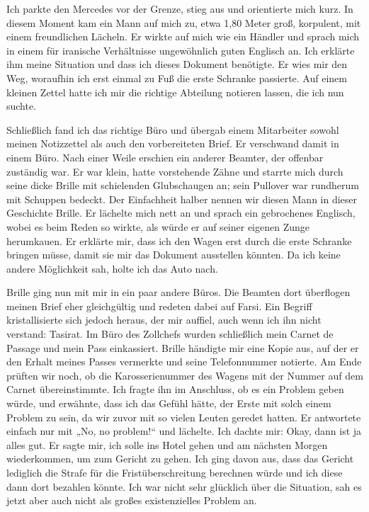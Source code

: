 Ich parkte den Mercedes vor der Grenze, stieg aus und orientierte mich kurz. In diesem Moment kam ein Mann auf mich zu, etwa 1,80 Meter groß, korpulent, mit einem freundlichen Lächeln. Er wirkte auf mich wie ein Händler und sprach mich in einem für iranische Verhältnisse ungewöhnlich guten Englisch an. Ich erklärte ihm meine Situation und dass ich dieses Dokument benötigte. Er wies mir den Weg, woraufhin ich erst einmal zu Fuß die erste Schranke passierte. Auf einem kleinen Zettel hatte ich mir die richtige Abteilung notieren lassen, die ich nun suchte.

Schließlich fand ich das richtige Büro und übergab einem Mitarbeiter sowohl meinen Notizzettel als auch den vorbereiteten Brief. Er verschwand damit in einem Büro. Nach einer Weile erschien ein anderer Beamter, der offenbar zuständig war. Er war klein, hatte vorstehende Zähne und starrte mich durch seine dicke Brille mit schielenden Glubschaugen an; sein Pullover war rundherum mit Schuppen bedeckt. Der Einfachheit halber nennen wir diesen Mann in dieser Geschichte Brille. Er lächelte mich nett an und sprach ein gebrochenes Englisch, wobei es beim Reden so wirkte, als würde er auf seiner eigenen Zunge herumkauen. Er erklärte mir, dass ich den Wagen erst durch die erste Schranke bringen müsse, damit sie mir das Dokument ausstellen könnten. Da ich keine andere Möglichkeit sah, holte ich das Auto nach.

Brille ging nun mit mir in ein paar andere Büros. Die Beamten dort überflogen meinen Brief eher gleichgültig und redeten dabei auf Farsi. Ein Begriff kristallisierte sich jedoch heraus, der mir auffiel, auch wenn ich ihn nicht verstand: Tasirat. Im Büro des Zollchefs wurden schließlich mein Carnet de Passage und mein Pass einkassiert. Brille händigte mir eine Kopie aus, auf der er den Erhalt meines Passes vermerkte und seine Telefonnummer notierte. Am Ende prüften wir noch, ob die Karosserienummer des Wagens mit der Nummer auf dem Carnet übereinstimmte. Ich fragte ihn im Anschluss, ob es ein Problem geben würde, und erwähnte, dass ich das Gefühl hätte, der Erste mit solch einem Problem zu sein, da wir zuvor mit so vielen Leuten geredet hatten. Er antwortete einfach nur mit „No, no problem!“ und lächelte. Ich dachte mir: Okay, dann ist ja alles gut. Er sagte mir, ich solle ins Hotel gehen und am nächsten Morgen wiederkommen, um zum Gericht zu gehen. Ich ging davon aus, dass das Gericht lediglich die Strafe für die Fristüberschreitung berechnen würde und ich diese dann dort bezahlen könnte. Ich war nicht sehr glücklich über die Situation, sah es jetzt aber auch nicht als großes existenzielles Problem an.

